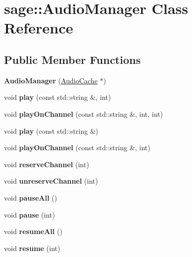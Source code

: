\hypertarget{classsage_1_1AudioManager}{}\section{sage\+::Audio\+Manager Class Reference}
\label{classsage_1_1AudioManager}
\subsection*{Public Member Functions}
\begin{DoxyCompactItemize}
\item 
\mbox{\label{classsage_1_1AudioManager_a95f2ed16e4c7fdb2396624d45b398b00}} 
{\bfseries Audio\+Manager} (\mbox{\hyperlink{classsage_1_1AudioCache}{Audio\+Cache}} $\ast$)
\item 
\mbox{\label{classsage_1_1AudioManager_a251df80c76c4c4031015c4681a2d0c0f}} 
void {\bfseries play} (const std\+::string \&, int)
\item 
\mbox{\label{classsage_1_1AudioManager_a8393c79d76763795c835c0a636a8a8f3}} 
void {\bfseries play\+On\+Channel} (const std\+::string \&, int, int)
\item 
\mbox{\label{classsage_1_1AudioManager_a09ed800755c7d35a12a889319494b798}} 
void {\bfseries play} (const std\+::string \&)
\item 
\mbox{\label{classsage_1_1AudioManager_a928db254848a8eb2536ba065a0b719d3}} 
void {\bfseries play\+On\+Channel} (const std\+::string \&, int)
\item 
\mbox{\label{classsage_1_1AudioManager_a02e449fb8c3d797336a17781a4d1abd4}} 
void {\bfseries reserve\+Channel} (int)
\item 
\mbox{\label{classsage_1_1AudioManager_a96ab7e1b8ea7f52a6cd09675efb042eb}} 
void {\bfseries unreserve\+Channel} (int)
\item 
\mbox{\label{classsage_1_1AudioManager_aae16a9d852718c100659b185f86533b3}} 
void {\bfseries pause\+All} ()
\item 
\mbox{\label{classsage_1_1AudioManager_a6e851147d522d6dc255fc0b1f0134832}} 
void {\bfseries pause} (int)
\item 
\mbox{\label{classsage_1_1AudioManager_a295fca304a8dbd5d1e3c788a20d8e838}} 
void {\bfseries resume\+All} ()
\item 
\mbox{\label{classsage_1_1AudioManager_a694c3a19eed23e395d3d03a9b4af5cdc}} 
void {\bfseries resume} (int)
\end{DoxyCompactItemize}


